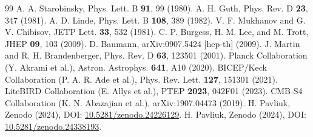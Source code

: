 \documentclass[11pt,a4paper]{article}
\begin{document}
\begin{thebibliography}{99}
 A. A. Starobinsky, Phys. Lett. B \textbf{91}, 99 (1980).
 A. H. Guth, Phys. Rev. D \textbf{23}, 347 (1981).
 A. D. Linde, Phys. Lett. B \textbf{108}, 389 (1982).
 V. F. Mukhanov and G. V. Chibisov, JETP Lett. \textbf{33}, 532 (1981).
 C. P. Burgess, H. M. Lee, and M. Trott, JHEP \textbf{09}, 103 (2009).
 D. Baumann, arXiv:0907.5424 [hep-th] (2009).
 J. Martin and R. H. Brandenberger, Phys. Rev. D \textbf{63}, 123501 (2001).
 Planck Collaboration (Y. Akrami et al.), Astron. Astrophys. \textbf{641}, A10 (2020).
 BICEP/Keck Collaboration (P. A. R. Ade et al.), Phys. Rev. Lett. \textbf{127}, 151301 (2021).
 LiteBIRD Collaboration (E. Allys et al.), PTEP \textbf{2023}, 042F01 (2023).
 CMB-S4 Collaboration (K. N. Abazajian et al.), arXiv:1907.04473 (2019).
 H. Pavliuk, Zenodo (2024), DOI: \href{https://doi.org/10.5281/zenodo.24226129}{10.5281/zenodo.24226129}.
 H. Pavliuk, Zenodo (2024), DOI: \href{https://doi.org/10.5281/zenodo.24338193}{10.5281/zenodo.24338193}.
\end{thebibliography}
\end{document}

